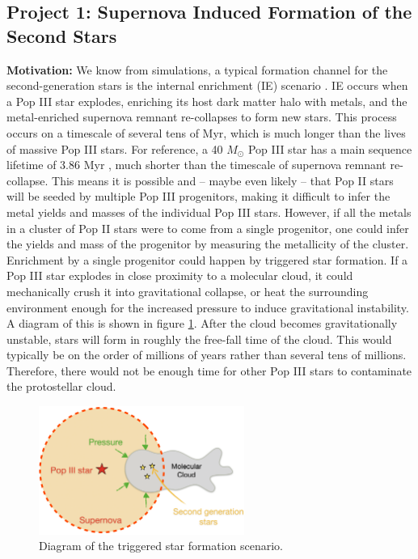 \documentclass[letterpaper, 12pt]{article}
\begin{document}
\subsection*{Project 1: Supernova Induced Formation of the Second Stars}
\label{sec:tsf}

\textbf{Motivation:} We know from simulations, a typical formation channel for the second-generation stars is the internal enrichment (IE) scenario \citep{Chiaki2019}. IE occurs when a Pop III star explodes, enriching its host dark matter halo with metals, and the metal-enriched supernova remnant re-collapses to form new stars. This process occurs on a timescale of several tens of Myr, which is much longer than the lives of massive Pop III stars. For reference, a 40 $M_\odot$ Pop III star has a main sequence lifetime of 3.86 Myr \citep{Schaerer2002}, much shorter than the timescale of supernova remnant re-collapse. This means it is possible and -- maybe even likely -- that Pop II stars will be seeded by multiple Pop III progenitors, making it difficult to infer the metal yields and masses of the individual Pop III stars. However, if all the metals in a cluster of Pop II stars were to come from a single progenitor, one could infer the yields and mass of the progenitor by measuring the metallicity of the cluster. Enrichment by a single progenitor could happen by triggered star formation. If a Pop III star explodes in close proximity to a molecular cloud, it could mechanically crush it into gravitational collapse, or heat the surrounding environment enough for the increased pressure to induce gravitational instability. A diagram of this is shown in figure \ref{fig:tsf}. After the cloud becomes gravitationally unstable, stars will form in roughly the free-fall time of the cloud. This would typically be on the order of millions of years rather than several tens of millions. Therefore, there would not be enough time for other Pop III stars to contaminate the protostellar cloud.

\begin{figure}
  \includegraphics[width=0.6\textwidth]{figures/tsf2}
  \caption{Diagram of the triggered star formation scenario.}
  \label{fig:tsf}
\end{figure}
\end{document}
